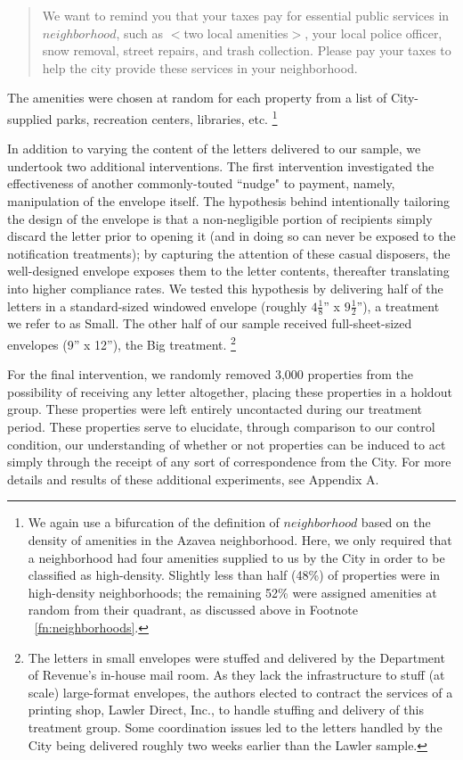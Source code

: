 \documentclass[12pt,titlepage]{article}
\begin{document}
\blockquote{
	We want to remind you that your taxes pay for essential public services 
	in $neighborhood$, such as $<$two local amenities$>$, your local police officer, 
	snow removal, street repairs, and trash collection. Please pay your taxes 
	to help the city provide these services in your neighborhood.
}

The amenities were chosen at random for each property from a list of 
City-supplied parks, recreation centers, libraries, etc.
\footnote{
	We again use a bifurcation of the definition of $neighborhood$ based on
	the density of amenities in the Azavea neighborhood. Here, we only 
	required that a neighborhood had four amenities supplied to us by the
	City in order to be classified as high-density. Slightly less than 
	half (48\%) of properties were in high-density neighborhoods; the 
	remaining 52\% were assigned amenities at random from their quadrant, 
	as discussed above in Footnote ~\ref{fn:neighborhoods}. 
}

In addition to varying the content of the letters delivered to our sample,
we undertook two additional interventions. The first intervention 
investigated the effectiveness of another commonly-touted  ``nudge" to payment,
namely, manipulation of the envelope itself. The hypothesis behind 
intentionally tailoring the design of the envelope is that a non-negligible 
portion of recipients simply discard the letter prior to opening it 
(and in doing so can never be exposed to the notification treatments); 
by capturing the attention of these casual disposers, the well-designed 
envelope exposes them to the letter contents, thereafter translating into 
higher compliance rates. We tested this hypothesis by delivering half of 
the letters in a standard-sized windowed envelope
(roughly $4\frac18$'' x $9\frac12$''), a treatment we refer to as Small. 
The other half of our sample received full-sheet-sized envelopes (9'' x 12''), 
the Big treatment. 
\footnote{
	The letters in small envelopes were stuffed and delivered by the 
	Department of Revenue's in-house mail room. As they lack the 
	infrastructure to stuff (at scale) large-format envelopes, the authors 
	elected to contract the services of a printing shop, Lawler Direct, Inc., 
	to handle stuffing and delivery of this treatment group. Some 
	coordination issues led to the letters handled by the City being 
	delivered roughly two weeks earlier than the Lawler sample. 
}

For the final intervention, we randomly removed 3,000 properties from 
the possibility of receiving any letter altogether, placing these 
properties in a holdout group. These properties were left entirely 
uncontacted during our treatment period. These properties serve to 
elucidate, through comparison to our control condition, our 
understanding of whether or not properties can be induced to act simply 
through the receipt of any sort of correspondence from the City. 
For more details and results of these additional experiments, see Appendix A.
\end{document}
